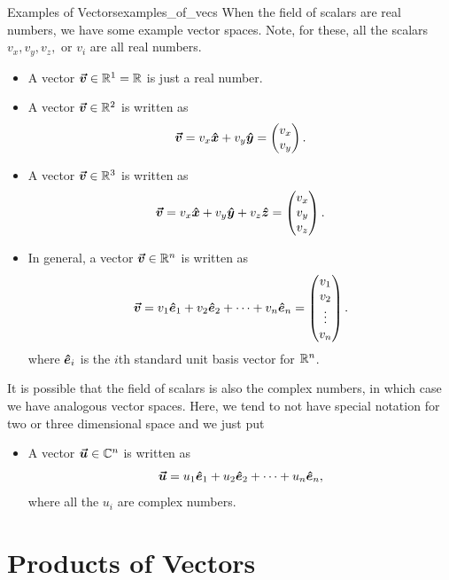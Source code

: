         \begin{ex}{Examples of Vectors}{examples_of_vecs}
        When the field of scalars are real numbers, we have some example vector spaces. Note, for these, all the scalars $v_x,v_y,v_z,$ or $v_i$ are all real numbers.
        \begin{itemize}
            \item A vector $\boldsymbol{\boldsymbol{\vec{v}}} \in \mathbb{R}^1=\mathbb{R}$ is just a real number.
            \item A vector $\boldsymbol{\boldsymbol{\vec{v}}} \in \mathbb{R}^2$ is written as 
            \[
            \boldsymbol{\boldsymbol{\vec{v}}} = v_x \boldsymbol{\hat{x}} + v_y \boldsymbol{\hat{y}} = \begin{pmatrix} v_x \\ v_y \end{pmatrix}.
            \]
            \item A vector $\boldsymbol{\boldsymbol{\vec{v}}} \in \mathbb{R}^3$ is written as 
            \[
            \boldsymbol{\boldsymbol{\vec{v}}} = v_x \boldsymbol{\hat{x}} + v_y \boldsymbol{\hat{y}} + v_z \boldsymbol{\hat{z}} = \begin{pmatrix} v_x \\ v_y \\ v_z \end{pmatrix}.
            \]
            \item In general, a vector $\boldsymbol{\boldsymbol{\vec{v}}} \in \mathbb{R}^n$ is written as
            \[
            \boldsymbol{\boldsymbol{\vec{v}}} = v_1 \boldsymbol{\hat{e}}_1 + v_2 \boldsymbol{\hat{e}}_2 + \cdots + v_n \boldsymbol{\hat{e}}_n = \begin{pmatrix} v_1 \\ v_2 \\ \vdots \\ v_n \end{pmatrix}.
            \]
            where $\boldsymbol{\hat{e}}_i$ is the $i$th standard unit basis vector for $\mathbb{R}^n$.
        \end{itemize}
        It is possible that the field of scalars is also the complex numbers, in which case we have analogous vector spaces. Here, we tend to not have special notation for two or three dimensional space and we just put
        \begin{itemize}
            \item A vector $\boldsymbol{\boldsymbol{\vec{u}}} \in \mathbb{C}^n$ is written as
            \[
            \boldsymbol{\boldsymbol{\vec{u}}} = u_1 \boldsymbol{\hat{e}}_1 + u_2 \boldsymbol{\hat{e}}_2 + \cdots + u_n \boldsymbol{\hat{e}}_n,
            \]
            where all the $u_i$ are complex numbers.
        \end{itemize}
        \end{ex}
        
        \section{Products of Vectors}
        
